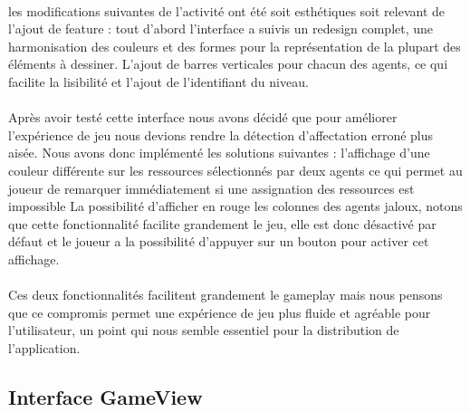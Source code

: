 \documentclass[a4paper, 11pt]{article}
\begin{document}
\paragraph{}
les modifications suivantes de l’activité ont été soit esthétiques soit relevant de l’ajout de feature : tout d’abord l’interface a suivis un redesign complet, une harmonisation des couleurs et des formes pour la représentation de la plupart des éléments à dessiner. L’ajout de barres verticales pour chacun des agents, ce qui facilite la lisibilité et l’ajout de l’identifiant du niveau.
\paragraph{}
    Après avoir testé cette interface nous avons décidé que pour améliorer l'expérience de jeu nous devions rendre la détection d’affectation erroné plus aisée. Nous avons donc implémenté les solutions suivantes :
 l’affichage d’une couleur différente sur les ressources sélectionnés par deux agents ce qui permet au joueur de remarquer immédiatement si une assignation des ressources est impossible
La possibilité d’afficher en rouge les colonnes des agents jaloux, notons que cette fonctionnalité facilite grandement le jeu, elle est donc désactivé par défaut et le joueur a la possibilité d’appuyer sur un bouton pour activer cet affichage.
\paragraph{}
    Ces deux fonctionnalités facilitent grandement le gameplay mais nous pensons que ce compromis permet une expérience de jeu plus fluide et agréable pour l’utilisateur, un point qui nous semble essentiel pour la distribution de l’application. 


	\subsection{Interface GameView}
	
\end{document}
